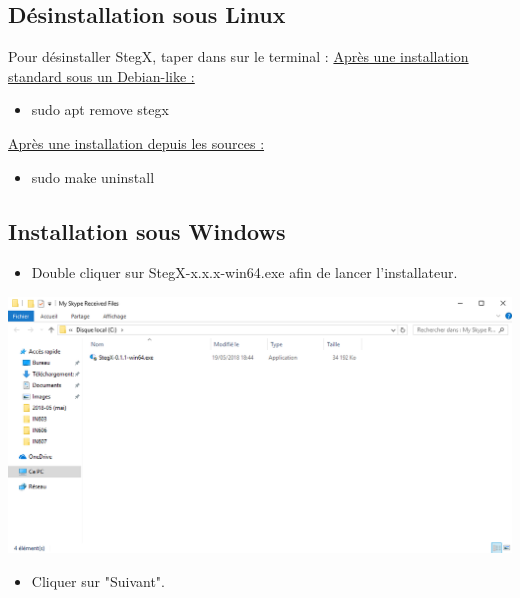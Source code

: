 \documentclass[11pt]{article}
\begin{document}
\subsection{Désinstallation sous Linux}

Pour désinstaller StegX, taper dans sur le terminal : \newline
\underline{Après une installation standard sous un Debian-like :}
\begin{itemize}
\item sudo apt remove stegx
\end{itemize}
\underline{Après une installation depuis les sources :}
\begin{itemize}
\item sudo make uninstall
\end{itemize}

\subsection{Installation sous Windows}

\begin{itemize}
\item Double cliquer sur StegX-x.x.x-win64.exe afin de lancer l'installateur.
\end{itemize}

\hspace{1cm}
\includegraphics[scale=0.5]{pictures/ouverture.png}
\vspace{1cm}

\begin{itemize}
\item Cliquer sur "Suivant". 
\end{itemize}
\end{document}
